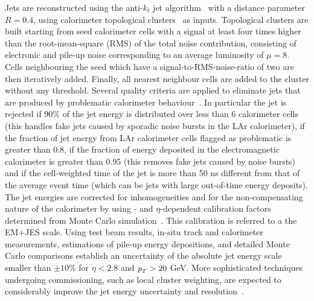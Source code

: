 Jets are reconstructed using the anti-$k_t$ jet algorithm~\cite{antiktalg} with a distance parameter $R = 0.4$, using calorimeter topological clusters~\cite{topoClusters} as inputs. Topological clusters are built starting from seed calorimeter cells with a signal at least four times higher than the root-mean-square (RMS) of the total noise contribution, consisting of electronic and pile-up noise corresponding to an average luminosity of $\mu=8$. Cells neighbouring the seed which have a signal-to-RMS-noise-ratio of two are then iteratively added. Finally, all nearest neighbour cells are added to the cluster without any threshold. Several quality criteria are applied to eliminate jets that are produced by problematic calorimeter behaviour~\cite{ATLAS-CONF-2010-038}.
In particular the jet is rejected if 90\% of the jet energy is distributed over less than 6 calorimeter cells (this handles fake jets caused by sporadic noise bursts in the LAr calorimeter), if the fraction of jet energy from LAr calorimeter cells flagged as problematic is greater than 0.8, if the fraction of energy deposited in the electromagnetic calorimeter is greater than 0.95 (this removes fake jets caused by noise bursts) and if the cell-weighted time of the jet is more than 50 ns different from that of the average event time (which can be jets with large out-of-time energy deposits). %
The jet energies are corrected for inhomogeneities and for
the non-compensating nature of the calorimeter by using \pt- and $\eta$-dependent calibration factors determined from Monte Carlo simulation~\cite{JESnote}. This calibration is referred to a the EM+JES scale.
Using test beam results, in-situ track and calorimeter measurements, estimations of pile-up energy depositions, and detailed Monte Carlo comparisons establish an uncertainty of the absolute jet energy scale smaller than $\pm 10\%$ for $\eta < 2.8$ and ${\emph{p}_{T}} > 20$ GeV. More sophisticated techniques undergoing commissioning, such as local cluster weighting, are expected to considerably improve the jet energy uncertainty and resolution~\cite{CSC}. 

